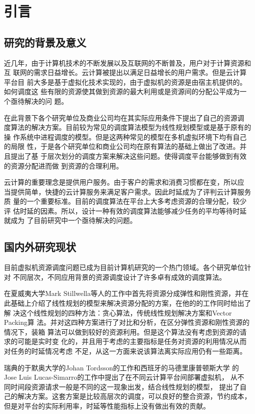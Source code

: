 

\chapter{引言}
\label{chap:introduction}


\section{研究的背景及意义}
近几年，由于计算机技术的不断发展以及互联网的不断普及，用户对于计算资源和互
联网的需求日益增长。云计算被提出以满足日益增长的用户需求。但是云计算平台目
前大多是基于虚拟化技术实现的，由于虚拟机的资源是由宿主机提供的。如何调度这
些有限的资源使其做到资源的最大利用或是资源间的分配公平成为一个亟待解决的问
题。

在此背景下各个研究单位及商业公司均在其实际应用条件下提出了自己的资源调
度算法的解决方案。目前较为常见的调度算法模型为线性规划模型或是基于原有的操
作系统中进程调度的模型。但是这两种常见的模型在多机虚拟环境下均有自己的局限
性，于是各个研究单位和商业公司均在原有算法的基础上做出了改进。并且提出了基
于层次划分的调度方案来解决这些问题。使得调度平台能够做到有效的资源分配进而做
到资源的合理利用。

云计算的重要理念是提供用户服务。由于客户的需求和消费习惯都在变，所以应
当提供简单，快捷的云计算服务来满足客户需求。因此时延成为了评判云计算服务质
量的一个重要标准。目前的调度算法在平台上大多考虑资源的合理分配，较少评
估时延的因素。所以，设计一种有效的调度算法能够减少任务的平均等待时延就成为
了目前研究中一个亟待解决的问题。

\section{国内外研究现状}
目前虚拟机资源调度问题已成为目前计算机研究的一个热门领域。各个研究单位针对
不同层次，不同应用背景的资源调度设计了许多卓有成效的调度算法。

在夏威夷大学Mark Stillwella等人的工作中\cite{ref3}首先将资源分成弹性和刚性资源，并在
此基础上介绍了线性规划的模型来解决资源分配的方案，在他的的工作同时给出了解
决这个线性规划的四种方法：贪心算法，传统线性规划解决方案和Vector Packing算
法。并对这四种方案进行了对比和分析，在区分弹性资源和刚性资源的情况下，装箱
算法可以做到较好的资源利用。但是这个算法没有考虑到资源的请求的可能是实时变
化的，并且用于考虑的主要指标是任务对资源的利用情况从而对任务的时延情况考虑
不足，从这一方面来说该算法离实际应用仍有一些距离。

瑞典的于默奥大学的Johan Tordsson的工作\cite{ref1}和西班牙的马德里康普顿斯大学
的Jose Luis Lucas-Simarro的工作\cite{ref2}中提出了在不同云计算平台间部署虚拟机，
从不同时间段资源请求一般是不同的这一现象出发，结合线性规划的模型，
提出了自己的解决方案。这套方案是比较高层次的调度，可以良好的整合资源，节约成本，
但是对平台的实际利用率，时延等性能指标上没有做出有效的贡献。

